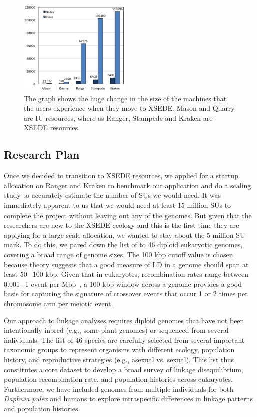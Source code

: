 \documentclass{sig-alternate}
\newcommand{\abhi}[1]{ {\textcolor{red} { ***Abhinav: #1 }}}
\newcommand{\abhi}[1]{ {}}
\begin{document}
\begin{figure} %
\centering
\includegraphics[width=0.48\textwidth]{figures/cores-nodes.png}
\caption{The graph shows the huge change in the size of the machines that the users experience when they move to XSEDE. Mason and Quarry are IU resources, where as Ranger, Stampede and Kraken are XSEDE resources. }
\label{fig:scaling}
\end{figure}

\subsection{Research Plan}\label{sec:plan}


Once we decided to transition to XSEDE resources, we applied for a startup allocation on Ranger and Kraken to benchmark our application and do a scaling study to accurately estimate the number of SUs we would need. It was immediately apparent to us that we would need at least 15 million SUs to complete the project without leaving out any of the genomes. But given that the researchers are new to the XSEDE ecology and this is the first time they are applying for a large scale allocation, we wanted to stay about the 5 million SU mark. To do this, we pared down the list of to 46 diploid eukaryotic genomes, covering a broad range of genome sizes.
The 100 kbp cutoff value is chosen because theory suggests that a good measure
of LD in a genome should span at least 50$-$100 kbp. Given that in eukaryotes, recombination rates range
between 0.001$-$1 event per Mbp~\cite{annurev-genom-082410-101412}, a 100 kbp window across a genome provides
a good basis for capturing the signature of crossover events that occur 1 or 2 times per chromosome arm per
meiotic event.

Our approach to linkage analyses requires diploid genomes that have not been intentionally inbred  (e.g., some plant genomes) or sequenced from several individuals. The list of 46 species are carefully selected from several important taxonomic groups to represent organisms with different ecology, population history, and reproductive strategies  (e.g., asexual vs. sexual). This list  thus constitutes a core dataset to develop a broad survey of linkage disequilibrium, population recombination rate, and population histories across eukaryotes. Furthermore, we have included genomes from multiple individuals for both {\it Daphnia pulex} and humans to explore intraspecific differences in linkage patterns and population histories. 
\end{document}
